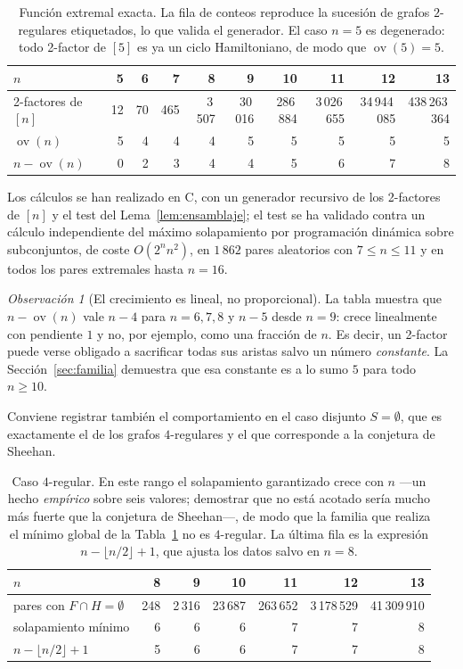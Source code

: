 \documentclass[11pt,a4paper]{article}
\theoremstyle{definition}
\theoremstyle{remark}
\newtheorem{observacion}[teorema]{Observación}
\newcommand{\ov}{\operatorname{ov}}
\begin{document}
\begin{table}[h]
\centering\small
\setlength{\tabcolsep}{4.5pt}
\begin{tabular}{lrrrrrrrrr}
\toprule
$n$ & 5 & 6 & 7 & 8 & 9 & 10 & 11 & 12 & 13\\
\midrule
2-factores de $[n]$ & 12 & 70 & 465 & 3\,507 & 30\,016 & 286\,884 & 3\,026\,655 & 34\,944\,085 & 438\,263\,364\\
$\ov(n)$ & 5 & 4 & 4 & 4 & 5 & 5 & 5 & 5 & 5\\
$n-\ov(n)$ & 0 & 2 & 3 & 4 & 4 & 5 & 6 & 7 & 8\\
\bottomrule
\end{tabular}
\caption{Función extremal exacta. La fila de conteos reproduce la sucesión de grafos $2$-regulares etiquetados, lo que valida el generador. El caso $n=5$ es degenerado: todo 2-factor de $[5]$ es ya un ciclo Hamiltoniano, de modo que $\ov(5)=5$.}\label{tab:ov}
\end{table}

Los cálculos se han realizado en C, con un generador recursivo de los 2-factores de $[n]$ y el test del Lema~\ref{lem:ensamblaje}; el test se ha validado contra un cálculo independiente del máximo solapamiento por programación dinámica sobre subconjuntos, de coste $O(2^n n^2)$, en $1\,862$ pares aleatorios con $7\le n\le11$ y en todos los pares extremales hasta $n=16$.

\begin{observacion}[El crecimiento es lineal, no proporcional]\label{obs:crecimiento}
La tabla muestra que $n-\ov(n)$ vale $n-4$ para $n=6,7,8$ y $n-5$ desde $n=9$: crece linealmente con pendiente $1$ y no, por ejemplo, como una fracción de $n$. Es decir, un 2-factor puede verse obligado a sacrificar todas sus aristas salvo un número \emph{constante}. La Sección~\ref{sec:familia} demuestra que esa constante es a lo sumo $5$ para todo $n\ge10$.
\end{observacion}

Conviene registrar también el comportamiento en el caso disjunto $S=\emptyset$, que es exactamente el de los grafos $4$-regulares y el que corresponde a la conjetura de Sheehan.

\begin{table}[h]
\centering
\begin{tabular}{lrrrrrr}
\toprule
$n$ & 8 & 9 & 10 & 11 & 12 & 13\\
\midrule
pares con $F\cap H=\emptyset$ & 248 & 2\,316 & 23\,687 & 263\,652 & 3\,178\,529 & 41\,309\,910\\
solapamiento mínimo & 6 & 6 & 6 & 7 & 7 & 8\\
$n-\lfloor n/2\rfloor+1$ & 5 & 6 & 6 & 7 & 7 & 8\\
\bottomrule
\end{tabular}
\caption{Caso $4$-regular. En este rango el solapamiento garantizado crece con $n$ —un hecho \emph{empírico} sobre seis valores; demostrar que no está acotado sería mucho más fuerte que la conjetura de Sheehan—, de modo que la familia que realiza el mínimo global de la Tabla~\ref{tab:ov} no es $4$-regular. La última fila es la expresión $n-\lfloor n/2\rfloor+1$, que ajusta los datos salvo en $n=8$.}\label{tab:reg4}
\end{table}
\end{document}
